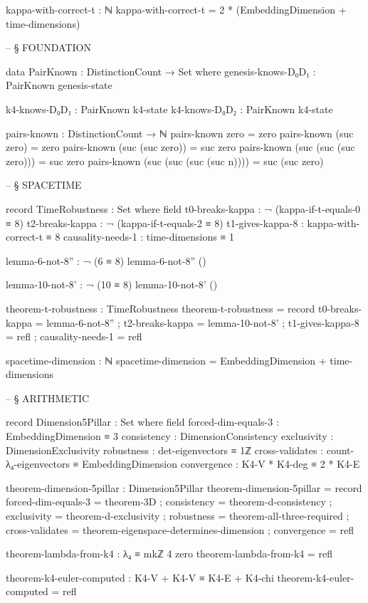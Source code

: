 \documentclass[11pt,a4paper]{book}
\begin{document}
\begin{code}
kappa-with-correct-t : ℕ
kappa-with-correct-t = 2 * (EmbeddingDimension + time-dimensions)


-- § FOUNDATION

data PairKnown : DistinctionCount → Set where
  genesis-knows-D₀D₁ : PairKnown genesis-state
  
  k4-knows-D₀D₁ : PairKnown k4-state
  k4-knows-D₀D₂ : PairKnown k4-state

pairs-known : DistinctionCount → ℕ
pairs-known zero = zero
pairs-known (suc zero) = zero
pairs-known (suc (suc zero)) = suc zero
pairs-known (suc (suc (suc zero))) = suc zero
pairs-known (suc (suc (suc (suc n)))) = suc (suc zero)


-- § SPACETIME

record TimeRobustness : Set where
  field
    t0-breaks-kappa   : ¬ (kappa-if-t-equals-0 ≡ 8)
    t2-breaks-kappa   : ¬ (kappa-if-t-equals-2 ≡ 8)
    t1-gives-kappa-8  : kappa-with-correct-t ≡ 8
    causality-needs-1 : time-dimensions ≡ 1

lemma-6-not-8'' : ¬ (6 ≡ 8)
lemma-6-not-8'' ()

lemma-10-not-8' : ¬ (10 ≡ 8)
lemma-10-not-8' ()

theorem-t-robustness : TimeRobustness
theorem-t-robustness = record
  { t0-breaks-kappa   = lemma-6-not-8''
  ; t2-breaks-kappa   = lemma-10-not-8'
  ; t1-gives-kappa-8  = refl
  ; causality-needs-1 = refl
  }

spacetime-dimension : ℕ
spacetime-dimension = EmbeddingDimension + time-dimensions


-- § ARITHMETIC

record Dimension5Pillar : Set where
  field
    forced-dim-equals-3 : EmbeddingDimension ≡ 3
    consistency     : DimensionConsistency
    exclusivity     : DimensionExclusivity
    robustness      : det-eigenvectors ≡ 1ℤ
    cross-validates : count-λ₄-eigenvectors ≡ EmbeddingDimension
    convergence     : K4-V * K4-deg ≡ 2 * K4-E

theorem-dimension-5pillar : Dimension5Pillar
theorem-dimension-5pillar = record
  { forced-dim-equals-3 = theorem-3D
  ; consistency     = theorem-d-consistency
  ; exclusivity     = theorem-d-exclusivity
  ; robustness      = theorem-all-three-required
  ; cross-validates = theorem-eigenspace-determines-dimension
  ; convergence     = refl
  }

theorem-lambda-from-k4 : λ₄ ≡ mkℤ 4 zero
theorem-lambda-from-k4 = refl

theorem-k4-euler-computed : K4-V + K4-V ≡ K4-E + K4-chi
theorem-k4-euler-computed = refl


\end{code}
\end{document}

